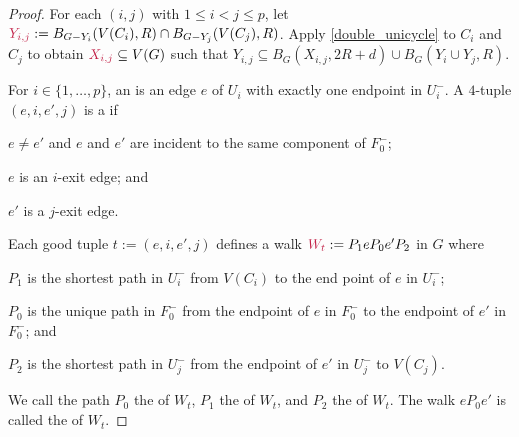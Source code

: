 \documentclass{patmorin}
\newcommand{\pat}[1]{\textcolor{Blue}{Pat: #1}}
\DeclarePairedDelimiter\set{\{}{\}}
\begin{document}
\begin{proof}
For each $(i,j)$ with $1\le i < j \le p$, let $\mathdefin{Y_{i,j}}:=B_{G-Y_i}(V(C_i),R)\cap B_{G-Y_j}(V(C_j),R)$.  Apply \cref{double_unicycle} to $C_i$ and $C_j$ to obtain $\mathdefin{X_{i,j}}\subseteq V(G)$ such that $Y_{i,j}\subseteq B_G(X_{i,j},2R+d) \cup B_G(Y_i\cup Y_j,R)$.


For $i\in\{1,\ldots,p\}$, an  is an edge $e$ of $U_i$ with exactly one endpoint in $U^-_i$.
A $4$-tuple $(e,i,e',j)$ is a  if
\begin{compactitem}
  \item $e\neq e'$ and $e$ and $e'$ are incident to the same component of $F_0^-$;
  \item $e$ is an $i$-exit edge;
  and \item $e'$ is a $j$-exit edge.
\end{compactitem}
Each good tuple $t:=(e,i,e',j)$  defines a walk $\mathdefin{W_t}:=P_1eP_0e'P_2$ in $G$ where
\begin{compactitem}
  \item $P_1$ is the shortest path in $U_i^-$ from $V(C_i)$ to the end point of $e$ in $U^-_i$;
  \item $P_0$ is the unique path in $F_0^-$ from the endpoint of $e$ in $F^-_0$ to the endpoint of $e'$ in $F^-_0$; and
  \item $P_2$ is the shortest path in $U_j^-$ from the endpoint of $e'$ in $U_j^-$ to $V(C_j)$.
\end{compactitem}
We call the path $P_0$ the  of $W_t$, $P_1$ the  of $W_t$, and $P_2$ the  of $W_t$.  The walk $eP_0e'$ is called the  of $W_t$.





\end{proof}
\end{document}
